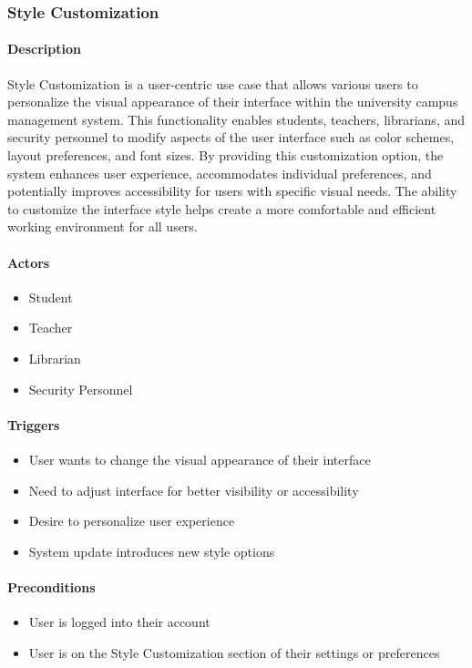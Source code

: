 \subsubsection{Style Customization}

\paragraph{Description}
Style Customization is a user-centric use case that allows various users to personalize the visual appearance of their interface within the university campus management system. This functionality enables students, teachers, librarians, and security personnel to modify aspects of the user interface such as color schemes, layout preferences, and font sizes. By providing this customization option, the system enhances user experience, accommodates individual preferences, and potentially improves accessibility for users with specific visual needs. The ability to customize the interface style helps create a more comfortable and efficient working environment for all users.

\paragraph{Actors}
\begin{itemize}
    \item Student
    \item Teacher
    \item Librarian
    \item Security Personnel
\end{itemize}

\paragraph{Triggers}
\begin{itemize}
    \item User wants to change the visual appearance of their interface
    \item Need to adjust interface for better visibility or accessibility
    \item Desire to personalize user experience
    \item System update introduces new style options
\end{itemize}

\paragraph{Preconditions}
\begin{itemize}
    \item User is logged into their account
    \item User is on the Style Customization section of their settings or preferences
\end{itemize}

